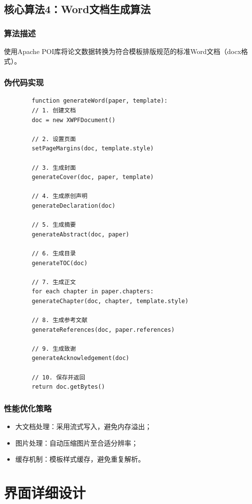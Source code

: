 \documentclass{../template/softeng}
\begin{document}
	\subsection{核心算法4：Word文档生成算法}

	\subsubsection{算法描述}
	使用Apache POI库将论文数据转换为符合模板排版规范的标准Word文档（docx格式）。

	\subsubsection{伪代码实现}
	\begin{verbatim}
		function generateWord(paper, template):
		// 1. 创建文档
		doc = new XWPFDocument()

		// 2. 设置页面
		setPageMargins(doc, template.style)

		// 3. 生成封面
		generateCover(doc, paper, template)

		// 4. 生成原创声明
		generateDeclaration(doc)

		// 5. 生成摘要
		generateAbstract(doc, paper)

		// 6. 生成目录
		generateTOC(doc)

		// 7. 生成正文
		for each chapter in paper.chapters:
		generateChapter(doc, chapter, template.style)

		// 8. 生成参考文献
		generateReferences(doc, paper.references)

		// 9. 生成致谢
		generateAcknowledgement(doc)

		// 10. 保存并返回
		return doc.getBytes()
	\end{verbatim}

	\subsubsection{性能优化策略}
	\begin{itemize}
		\item 大文档处理：采用流式写入，避免内存溢出；
		\item 图片处理：自动压缩图片至合适分辨率；
		\item 缓存机制：模板样式缓存，避免重复解析。
	\end{itemize}


	\section{界面详细设计}
\end{document}
